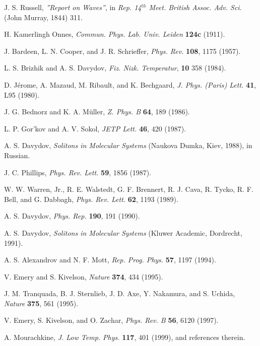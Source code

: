 \vspace{-5mm}
\begin{references}
\vspace{-15mm}

 J. S. Russell, {\it ''Report on Waves''}, in {\it Rep. 14$^{th}$ 
Meet. British Assoc. Adv. Sci.} (John Murray, 1844) 311.

 H. Kamerlingh Onnes, {\it Commun. Phys. Lab. Univ. Leiden} 
{\bf 124c} (1911).

 J. Bardeen, L. N. Cooper, and J. R. Schrieffer, {\it Phys. Rev.}
{\bf 108}, 1175 (1957). 

 L. S. Brizhik and A. S. Davydov, {\it Fiz. Nizk. 
Temperatur}, {\bf 10} 358 (1984).

 D. J\'{e}rome, A. Mazaud, M. Ribault, and K. Bechgaard, 
{\it J. Phys. (Paris) Lett.} {\bf 41}, L95 (1980).

 J. G. Bednorz and K. A. M\"{u}ller, {\it Z. Phys. B} 
{\bf 64}, 189 (1986).

 L. P. Gor'kov and A. V. Sokol, {\it JETP Lett.} {\bf 46},
420 (1987).

 A. S. Davydov, {\it Solitons in Molecular Systems} 
(Naukova Dumka, Kiev, 1988), in Russian.

 J. C. Phillips, {\it Phys. Rev. Lett.} {\bf 59}, 1856 (1987).

 W. W. Warren, Jr., R. E. Walstedt, G. F. Brennert, R. J. Cava, 
R. Tycko, R. F. Bell, and G. Dabbagh, {\it Phys. Rev. Lett.} {\bf 62}, 1193 (1989).

 A. S. Davydov, {\it Phys. Rep.} {\bf 190}, 191 (1990). 

 A. S. Davydov, {\it Solitons in Molecular Systems} 
(Kluwer Academic, Dordrecht, 1991).

 A. S. Alexandrov and N. F. Mott, {\it Rep. Prog. Phys.} {\bf 57}, 
1197 (1994).

 V. Emery and S. Kivelson, {\it Nature} {\bf 374}, 434 (1995).

 J. M. Tranquada, B. J. Sternlieb, J. D. Axe, Y. Nakamura,
and S. Uchida, {\it Nature} {\bf 375}, 561 (1995).

 V. Emery, S. Kivelson, and O. Zachar, {\it Phys. Rev. B}
{\bf 56}, 6120 (1997).

 A. Mourachkine, {\it J. Low Temp. Phys.} {\bf 117}, 401 
(1999), and references therein.


\end{references}
